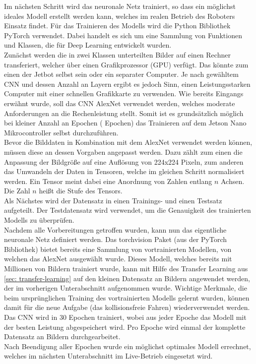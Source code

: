Im nächsten Schritt wird das neuronale Netz trainiert, so dass ein möglichst ideales Modell erstellt werden kann, welches im realen Betrieb des Roboters Einsatz findet. Für das Trainieren des Modells wird die Python Bibliothek PyTorch verwendet. Dabei handelt es sich um eine Sammlung von Funktionen und Klassen, die für \glqq Deep Learning\grqq{} entwickelt wurden. \\
Zunächst werden die in zwei Klassen unterteilten Bilder auf einen Rechner transferiert, welcher über einen Grafikprozessor (GPU) verfügt. Das könnte zum einen der Jetbot selbst sein oder ein separater Computer. Je nach gewähltem CNN und dessen Anzahl an Layern ergibt es jedoch Sinn, einen Leistungsstarken Computer mit einer schnellen Grafikkarte zu verwenden. Wie bereits Eingangs erwähnt wurde, soll das CNN AlexNet verwendet werden, welches moderate Anforderungen an die Rechenleistung stellt. Somit ist es grundsätzlich möglich bei kleiner Anzahl an Epochen ( Epochen) das Trainieren auf dem Jetson Nano Mikrocontroller selbst durchzuführen. \\
Bevor die Bilddaten in Kombination mit dem AlexNet verwendet werden können, müssen diese an dessen Vorgaben angepasst werden. Dazu zählt zum einen die Anpassung der Bildgröße auf eine Auflösung von 224x224 Pixeln, zum anderen das Umwandeln der Daten in Tensoren, welche im gleichen Schritt normalisiert werden. Ein Tensor meint dabei eine Anordnung von Zahlen entlang $n$ Achsen. Die Zahl $n$ heißt die Stufe des Tensors. \\
Als Nächstes wird der Datensatz in einen Trainings- und einen Testsatz aufgeteilt. Der Testdatensatz wird verwendet, um die Genauigkeit des trainierten Modells zu überprüfen.\\
Nachdem alle Vorbereitungen getroffen wurden, kann nun das eigentliche neuronale Netz definiert werden. Das \glqq torchvision\grqq{} Paket (aus der PyTorch Bibliothek) bietet bereits eine Sammlung von vortrainierten Modellen, von welchen das AlexNet ausgewählt wurde. Dieses Modell, welches bereits mit Millionen von Bildern trainiert wurde, kann mit Hilfe des Transfer Learning aus \autoref{sec: transfer-learning} auf den kleinen Datensatz an Bildern angewendet werden, der im vorherigen Unterabschnitt aufgenommen wurde. Wichtige Merkmale, die beim ursprünglichen Training des vortrainierten Modells gelernt wurden, können damit für die neue Aufgabe (das kollisionsfreie Fahren) wiederverwendet werden. \\
Das CNN wird in 30 Epochen trainiert, wobei aus jeder Epoche das Modell mit der besten Leistung abgespeichert wird. Pro Epoche wird einmal der komplette Datensatz an Bildern durchgearbeitet. \\
Nach Beendigung aller Epochen wurde ein möglichst optimales Modell errechnet, welches im nächsten Unterabschnitt im Live-Betrieb eingesetzt wird.

